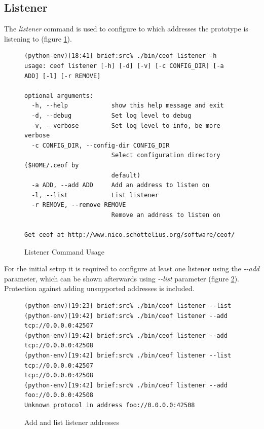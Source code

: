 \subsection{Listener}
The \textit{listener} command is used
to configure to which addresses the prototype is listening to (figure
\ref{listenerusage}).
\begin{figure}[tbp]
\caption{Listener Command Usage}
\label{listenerusage}
\begin{verbatim}
(python-env)[18:41] brief:src% ./bin/ceof listener -h
usage: ceof listener [-h] [-d] [-v] [-c CONFIG_DIR] [-a ADD] [-l] [-r REMOVE]

optional arguments:
  -h, --help            show this help message and exit
  -d, --debug           Set log level to debug
  -v, --verbose         Set log level to info, be more verbose
  -c CONFIG_DIR, --config-dir CONFIG_DIR
                        Select configuration directory ($HOME/.ceof by
                        default)
  -a ADD, --add ADD     Add an address to listen on
  -l, --list            List listener
  -r REMOVE, --remove REMOVE
                        Remove an address to listen on

Get ceof at http://www.nico.schottelius.org/software/ceof/
\end{verbatim}
\end{figure}
For the initial setup it is required to configure at least one listener
using the \textit{-{}-add} parameter, which can be shown afterwards using
\textit{-{}-list} parameter (figure \ref{addandlistlistener}). 
Protection against adding unsupported addresses is included.
\begin{figure}[htbp]
\caption{Add and list listener addresses}
\label{addandlistlistener}
\begin{verbatim}
(python-env)[19:23] brief:src% ./bin/ceof listener --list
(python-env)[19:42] brief:src% ./bin/ceof listener --add tcp://0.0.0.0:42507
(python-env)[19:42] brief:src% ./bin/ceof listener --add tcp://0.0.0.0:42508
(python-env)[19:42] brief:src% ./bin/ceof listener --list                   
tcp://0.0.0.0:42507
tcp://0.0.0.0:42508
(python-env)[19:42] brief:src% ./bin/ceof listener --add foo://0.0.0.0:42508 
Unknown protocol in address foo://0.0.0.0:42508
\end{verbatim}
\end{figure}
